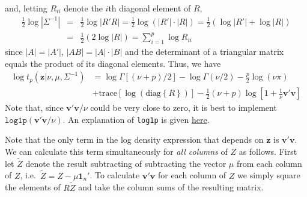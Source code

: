 \documentclass[12pt]{article}
\begin{document}
and, letting $R_{ii}$ denote the $i$th diagonal element of $R$,
\begin{eqnarray*}
  \frac{1}{2}\log |\Sigma^{-1}| &=&  \frac{1}{2}\log |R'R| = \frac{1}{2}\log\left(|R'| \cdot |R|\right) = \frac{1}{2}\left(\log |R'| + \log |R| \right)\\
  &=&\frac{1}{2}\left( 2 \log|R|\right)=  \sum_{i=1}^{p} \log R_{ii}
\end{eqnarray*} 
since $|A| = |A'|$, $|AB| = |A| \cdot |B|$ and the determinant of a triangular matrix equals the product of its diagonal elements.
Thus, we have
  \begin{align*}
    \log {t_p\left(\mathbf{z}|\nu,\mu, \Sigma^{-1} \right)} &= \log{\Gamma}\left[ \left( \nu + p \right)/2 \right] - \log{\Gamma}\left( \nu/2 \right) - \frac{p}{2}\log{(\nu \pi)}\\
    &+ \mbox{trace}\left[\log \left(\mbox{diag}\left\{R  \right\}  \right)\right]  - \frac{1}{2}(\nu + p) \log{ \left[ 1 + \frac{1}{\nu} \mathbf{v}'\mathbf{v}\right]}
\end{align*}
Note that, since $\mathbf{v}'\mathbf{v}/\nu$ could be very close to zero, it is best to implement $\texttt{log1p}(\mathbf{v}'\mathbf{v}/\nu)$.
An explanation of \texttt{log1p} is given 
\href{http://www.johndcook.com/blog/2010/06/07/math-library-functions-that-seem-unnecessary/}{here}.

Note that the only term in the log density expression that depends on $\mathbf{z}$ is $\mathbf{v}'\mathbf{v}$.
We can calculate this term simultaneously for \emph{all columns} of $Z$ as follows.
First let $\widetilde{Z}$ denote the result subtracting of subtracting the vector $\mu$ from each column of $Z$, i.e.\ $\widetilde{Z} = Z - \mu \mathbf{1}_n'$.
To calculate $\mathbf{v}'\mathbf{v}$ for each column of $Z$ we simply square the elements of $R\widetilde{Z}$ and take the column sums of the resulting matrix.
\end{document}
